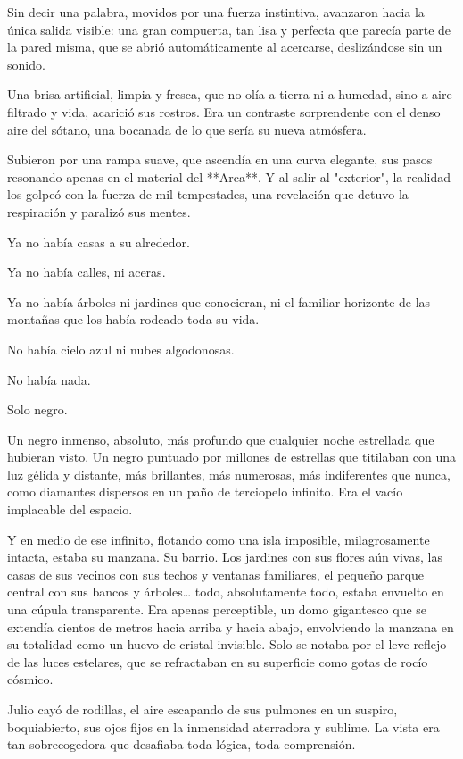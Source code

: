 \documentclass[a4paper,12pt]{book}
\begin{document}
Sin decir una palabra, movidos por una fuerza instintiva, avanzaron hacia la única salida visible: una gran compuerta, tan lisa y perfecta que parecía parte de la pared misma, que se abrió automáticamente al acercarse, deslizándose sin un sonido.

Una brisa artificial, limpia y fresca, que no olía a tierra ni a humedad, sino a aire filtrado y vida, acarició sus rostros. Era un contraste sorprendente con el denso aire del sótano, una bocanada de lo que sería su nueva atmósfera.

Subieron por una rampa suave, que ascendía en una curva elegante, sus pasos resonando apenas en el material del **Arca**. Y al salir al "exterior", la realidad los golpeó con la fuerza de mil tempestades, una revelación que detuvo la respiración y paralizó sus mentes.

Ya no había casas a su alrededor.

Ya no había calles, ni aceras.

Ya no había árboles ni jardines que conocieran, ni el familiar horizonte de las montañas que los había rodeado toda su vida.

No había cielo azul ni nubes algodonosas.

No había nada.

Solo negro.

Un negro inmenso, absoluto, más profundo que cualquier noche estrellada que hubieran visto. Un negro puntuado por millones de estrellas que titilaban con una luz gélida y distante, más brillantes, más numerosas, más indiferentes que nunca, como diamantes dispersos en un paño de terciopelo infinito. Era el vacío implacable del espacio.

Y en medio de ese infinito, flotando como una isla imposible, milagrosamente intacta, estaba su manzana. Su barrio. Los jardines con sus flores aún vivas, las casas de sus vecinos con sus techos y ventanas familiares, el pequeño parque central con sus bancos y árboles… todo, absolutamente todo, estaba envuelto en una cúpula transparente. Era apenas perceptible, un domo gigantesco que se extendía cientos de metros hacia arriba y hacia abajo, envolviendo la manzana en su totalidad como un huevo de cristal invisible. Solo se notaba por el leve reflejo de las luces estelares, que se refractaban en su superficie como gotas de rocío cósmico.

Julio cayó de rodillas, el aire escapando de sus pulmones en un suspiro, boquiabierto, sus ojos fijos en la inmensidad aterradora y sublime. La vista era tan sobrecogedora que desafiaba toda lógica, toda comprensión.
\end{document}
